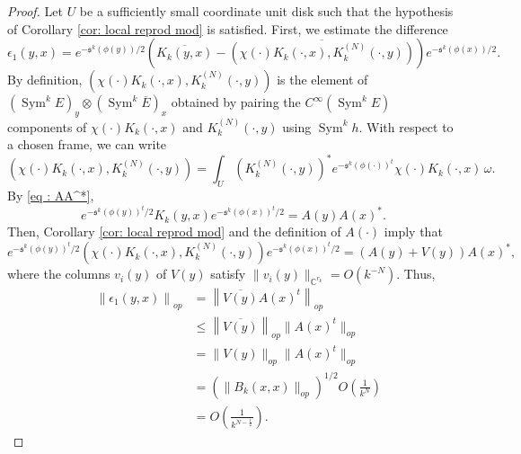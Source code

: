 \documentclass{amsart}
\theoremstyle{definition}
\theoremstyle{remark}
\numberwithin{equation}{section}
\DeclareMathOperator{\Sym}{Sym}
\begin{document}
\begin{proof}
Let $U$ be a sufficiently small coordinate unit disk such that the hypothesis of Corollary \ref{cor: local reprod mod} is satisfied. First, we estimate the difference
$$
\epsilon_1(y,x) = e^{-\mathfrak{s}^k(\phi(y))/2} \left (  \overline{K_k(y,x)} - \overline{\left ( \chi(\cdot) K_k(\cdot,x), K_k^{(N)}(\cdot,y) \right )} \right ) e^{-\mathfrak{s}^k(\phi(x))/2}.
$$
By definition, $\left ( \chi(\cdot) K_k(\cdot,x), K_k^{(N)}(\cdot,y) \right )$ is the element of $\left ( \Sym^kE \right )_y \otimes \left ( \Sym^k \overline{E} \right )_x$ obtained by pairing the $C^\infty(\Sym^k E)$ components of $\chi(\cdot) K_k(\cdot,x)$ and $K_k^{(N)}(\cdot,y)$ using $\Sym^k h$. With respect to a chosen frame, we can write 
$$
\left ( \chi(\cdot) K_k(\cdot,x), K_k^{(N)}(\cdot,y) \right ) =  \int_U \left (  K_k^{(N)}(\cdot ,y) \right)^* e^{-\mathfrak{s}^k(\phi(\cdot))^t}  \chi(\cdot) K_k(\cdot,x) \, \omega .
$$ 
By \eqref{eq : AA^*}, 
$$
e^{-\mathfrak{s}^k(\phi(y))^t/2} K_k(y,x) e^{-\mathfrak{s}^k(\phi(x))^t/2} = A(y) A(x)^*.
$$
Then, Corollary \ref{cor: local reprod mod} and the definition of $A(\cdot)$ imply that 
$$
e^{-\mathfrak{s}^k(\phi(y))^t/2}  \left ( \chi(\cdot) K_k(\cdot, x), K_k^{(N)}(\cdot, y) \right )e^{-\mathfrak{s}^k(\phi(x))^t/2} = (A(y)+V(y))A(x)^*,
$$
where the columns $v_i(y)$ of $V(y)$ satisfy $\|v_i(y)\|_{\mathbb{C}^{r_k}} = O(k^{-N})$. Thus,
\begin{align*}
 \hspace{10pt} \left \| \epsilon_1(y,x) \right \|_{op}    & = \left \|\overline{V(y)}A(x)^t \right \|_{op} \\
    & \leq \left \| \overline{V(y)} \right \|_{op} \|A(x)^t\|_{op} \\
    & = \|V(y)\|_{op} \|A(x)^t\|_{op} \\
    & = (\|B_k (x,x)\|_{op})^{1/2} O\left ( \frac{1}{k^{N}} \right ) \\
    & = O\left ( \frac{1}{k^{N-\frac{1}{2}}} \right ).
\end{align*}



\end{proof}
\end{document}
